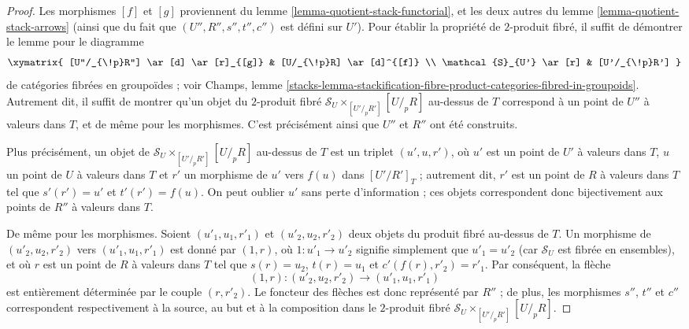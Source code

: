 \begin{proof}
Les morphismes $[f]$ et $[g]$ proviennent du lemme \ref{lemma-quotient-stack-functorial}, et les deux autres du lemme \ref{lemma-quotient-stack-arrows} (ainsi que du fait que $(U'', R'', s'', t'', c'')$ est défini sur $U'$). Pour établir la propriété de $2$-produit fibré, il suffit de démontrer le lemme pour le diagramme
$$
\xymatrix{
[U''/_{\!p}R''] \ar[d] \ar[r]_{[g]} & [U/_{\!p}R] \ar[d]^{[f]} \\
\mathcal{S}_{U'} \ar[r] & [U'/_{\!p}R']
}
$$
de catégories fibrées en groupoïdes ; voir Champs, lemme \ref{stacks-lemma-stackification-fibre-product-categories-fibred-in-groupoids}. Autrement dit, il suffit de montrer qu'un objet du $2$-produit fibré $\mathcal{S}_U \times_{[U'/_{\!p}R']} [U/_{\!p}R]$ au-dessus de $T$ correspond à un point de $U''$ à valeurs dans $T$, et de même pour les morphismes. C'est précisément ainsi que $U''$ et $R''$ ont été construits.

\medskip\noindent
Plus précisément, un objet de $\mathcal{S}_U \times_{[U'/_{\!p}R']} [U/_{\!p}R]$ au-dessus de $T$ est un triplet $(u', u, r')$, où $u'$ est un point de $U'$ à valeurs dans $T$, $u$ un point de $U$ à valeurs dans $T$ et $r'$ un morphisme de $u'$ vers $f(u)$ dans $[U'/R']_T$ ; autrement dit, $r'$ est un point de $R$ à valeurs dans $T$ tel que $s'(r') = u'$ et $t'(r') = f(u)$. On peut oublier $u'$ sans perte d'information ; ces objets correspondent donc bijectivement aux points de $R''$ à valeurs dans $T$.

\medskip\noindent
De même pour les morphismes. Soient $(u'_1, u_1, r'_1)$ et $(u'_2, u_2, r'_2)$ deux objets du produit fibré au-dessus de $T$. Un morphisme de $(u'_2, u_2, r'_2)$ vers $(u'_1, u_1, r'_1)$ est donné par $(1, r)$, où $1 : u'_1 \to u'_2$ signifie simplement que $u'_1 = u'_2$ (car $\mathcal{S}_U$ est fibrée en ensembles), et où $r$ est un point de $R$ à valeurs dans $T$ tel que $s(r) = u_2$, $t(r) = u_1$ et $c'(f(r), r'_2) = r'_1$. Par conséquent, la flèche
$$
(1, r) : (u'_2, u_2, r'_2) \to (u'_1, u_1, r'_1)
$$
est entièrement déterminée par le couple $(r, r'_2)$. Le foncteur des flèches est donc représenté par $R''$ ; de plus, les morphismes $s''$, $t''$ et $c''$ correspondent respectivement à la source, au but et à la composition dans le $2$-produit fibré $\mathcal{S}_U \times_{[U'/_{\!p}R']} [U/_{\!p}R]$.
\end{proof}







